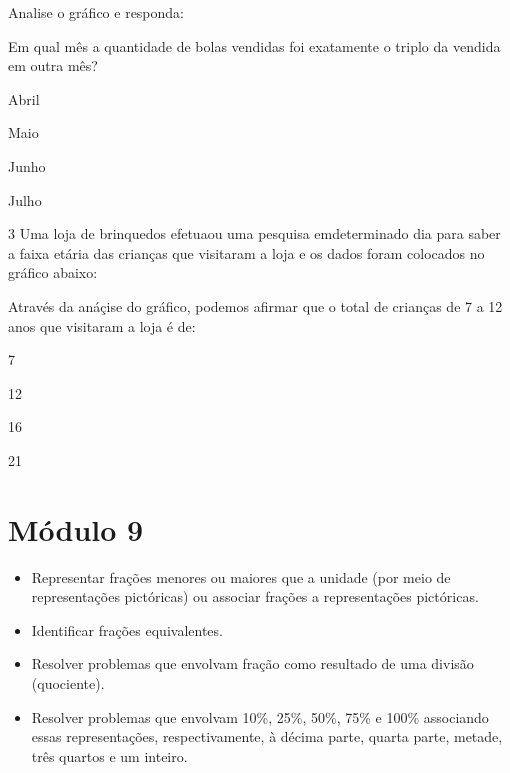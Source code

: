 Analise o gráfico e responda:

Em qual mês a quantidade de bolas vendidas foi exatamente o triplo da
vendida em outra mês?

\begin{escolha}
\item
  Abril
\item
  Maio
\item
  Junho
\item
  Julho
\end{escolha}


\num{3} Uma loja de brinquedos efetuaou uma pesquisa emdeterminado dia para
saber a faixa etária das crianças que visitaram a loja e os dados foram
colocados no gráfico abaixo:


Através da anáçise do gráfico, podemos afirmar que o total de crianças
de 7 a 12 anos que visitaram a loja é de:

\begin{escolha}
\item
  7
\item
  12
\item
  16
\item
  21
\end{escolha}


\chapter{Módulo 9}



\begin{itemize}
\item Representar frações menores ou maiores que a unidade (por meio de
representações pictóricas) ou associar frações a representações pictóricas.

\item Identificar frações equivalentes.

\item Resolver problemas que envolvam fração como resultado de uma divisão
(quociente).

\item Resolver problemas que envolvam 10\%, 25\%, 50\%, 75\% e 100\%
associando essas representações, respectivamente, à décima parte, quarta parte, metade,
três quartos e um inteiro.
\end{itemize}

